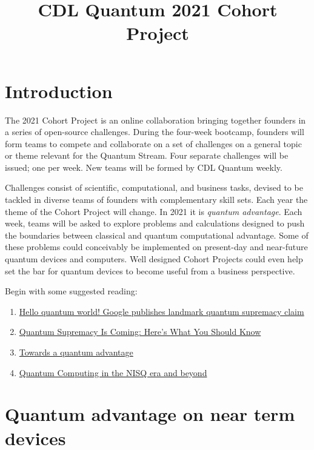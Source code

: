 \documentclass[12pt]{article}
\title{CDL Quantum 2021 Cohort Project}
\begin{document}
\maketitle

\thispagestyle{empty}
\section{Introduction}

The 2021 Cohort Project is an online collaboration bringing together founders in a series of open-source challenges.
During the four-week bootcamp, founders will form teams to compete and collaborate on a set of challenges on a general topic or theme
relevant for the Quantum Stream.  Four separate challenges will be issued; one per week.  New teams will be formed by CDL Quantum weekly.

Challenges consist of scientific, computational, and business tasks, devised to be tackled in diverse teams of founders with complementary skill sets.  Each year the theme of the Cohort Project will change.  In 2021 it is {\it quantum advantage}.  
Each week, teams will be asked to explore problems and calculations designed to push the boundaries between classical
and quantum computational advantage.
Some of these problems could conceivably be implemented on present-day and near-future quantum devices and computers.
Well designed Cohort Projects could even help set the bar for quantum devices to become useful from a business perspective.

Begin with some suggested reading:
\begin{enumerate}
\item \href{https://www.nature.com/articles/d41586-019-03213-z}{Hello quantum world! Google publishes landmark quantum supremacy claim}
\item \href{https://www.quantamagazine.org/quantum-supremacy-is-coming-heres-what-you-should-know-20190718/}{Quantum Supremacy Is Coming: Here's What You Should Know}
\item \href{https://physicsworld.com/a/towards-a-quantum-advantage/}{Towards a quantum advantage}
\item \href{https://arxiv.org/abs/1801.00862}{Quantum Computing in the NISQ era and beyond}
\end{enumerate}


\section{Quantum advantage on near term devices}
\end{document}
